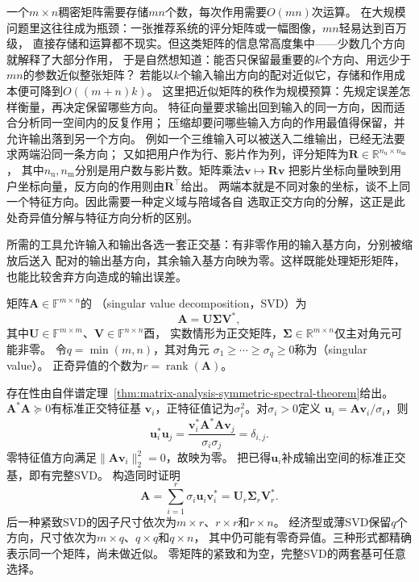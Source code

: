 一个$m\times n$稠密矩阵需要存储$mn$个数，每次作用需要$O(mn)$次运算。
在大规模问题里这往往成为瓶颈：一张推荐系统的评分矩阵或一幅图像，$mn$轻易达到百万级，
直接存储和运算都不现实。但这类矩阵的信息常高度集中——少数几个方向就解释了大部分作用，
于是自然想知道：能否只保留最重要的$k$个方向、用远少于$mn$的参数近似整张矩阵？
若能以$k$个输入输出方向的配对近似它，存储和作用成本便可降到$O((m+n)k)$。
这里把近似矩阵的秩作为规模预算：先规定误差怎样衡量，再决定保留哪些方向。
特征向量要求输出回到输入的同一方向，因而适合分析同一空间内的反复作用；
压缩却要问哪些输入方向的作用最值得保留，并允许输出落到另一个方向。
例如一个三维输入可以被送入二维输出，已经无法要求两端沿同一条方向；
又如把用户作为行、影片作为列，评分矩阵为$\bm R\in\mathbb R^{n_{\mathrm u}\times n_{\mathrm m}}$，
其中$n_{\mathrm u},n_{\mathrm m}$分别是用户数与影片数。矩阵乘法$\bm v\mapsto\bm R\bm v$
把影片坐标向量映到用户坐标向量，反方向的作用则由$\bm R^\top$给出。
两端本就是不同对象的坐标，谈不上同一个特征方向。因此需要一种定义域与陪域各自
选取正交方向的分解，这正是此处奇异值分解与特征方向分析的区别。

所需的工具允许输入和输出各选一套正交基：有非零作用的输入基方向，分别被缩放后送入
配对的输出基方向，其余输入基方向映为零。这样既能处理矩形矩阵，也能比较舍弃方向造成的输出误差。
\begin{definition}[奇异值分解]
\label{def:matrix-analysis-svd}
矩阵$\bm A\in\mathbb F^{m\times n}$的
（singular value decomposition，SVD）为
\begin{equation}
 \bm A=\bm U\bm\Sigma\bm V^*,
 \label{eq:matrix-analysis-svd}
\end{equation}
其中$\bm U\in\mathbb F^{m\times m}$、$\bm V\in\mathbb F^{n\times n}$酉，
实数情形为正交矩阵，$\bm\Sigma\in\mathbb R^{m\times n}$仅主对角元可能非零。
令$q=\min(m,n)$，其对角元
$\sigma_1\geq\cdots\geq\sigma_q\geq0$称为（singular value）。
正奇异值的个数为$r=\operatorname{rank}(\bm A)$。
\end{definition}

存在性由自伴谱定理~\ref{thm:matrix-analysis-symmetric-spectral-theorem}给出。$\bm A^*\bm A\succeq0$有标准正交特征基
$\bm v_i$，正特征值记为$\sigma_i^2$。对$\sigma_i>0$定义
$\bm u_i=\bm A\bm v_i/\sigma_i$，则
\[
 \bm u_i^*\bm u_j
 =\frac{\bm v_i^*\bm A^*\bm A\bm v_j}{\sigma_i\sigma_j}
 =\delta_{i,j}.
\]
零特征值方向满足$\lVert\bm A\bm v_i\rVert_2^2=0$，故映为零。
把已得$\bm u_i$补成输出空间的标准正交基，即有完整SVD。
构造同时证明
\begin{equation}
 \bm A=\sum_{i=1}^r\sigma_i\bm u_i\bm v_i^*
       =\bm U_r\bm\Sigma_r\bm V_r^*.
 \label{eq:matrix-analysis-svd-rank-one-sum}
\end{equation}
后一种紧致SVD的因子尺寸依次为$m\times r$、$r\times r$和$r\times n$。
经济型或薄SVD保留$q$个方向，尺寸依次为$m\times q$、$q\times q$和$q\times n$，
其中仍可能有零奇异值。三种形式都精确表示同一个矩阵，尚未做近似。
零矩阵的紧致和为空，完整SVD的两套基可任意选择。

